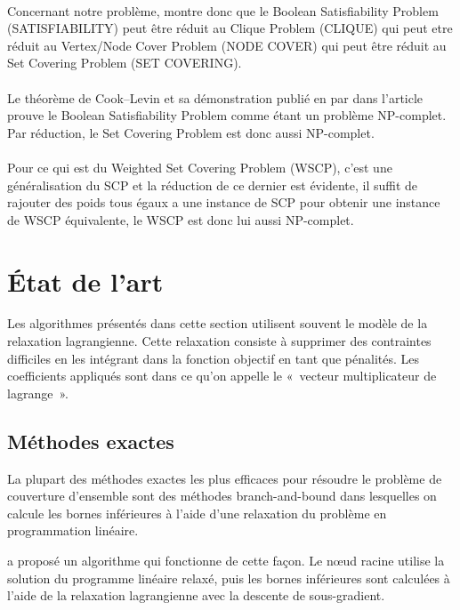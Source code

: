 \documentclass[12pt,letterpaper,twoside]{article}
\begin{document}
		\paragraph*{}
			Concernant notre problème, \citeauthor{Karp1972} montre donc que le Boolean Satisfiability Problem (SATISFIABILITY) peut être réduit au Clique Problem (CLIQUE) qui peut etre réduit au Vertex/Node Cover Problem (NODE COVER) qui peut être réduit au Set Covering Problem (SET COVERING).
		\paragraph*{}
			Le théorème de Cook–Levin et sa démonstration publié en \citeyear{Cook1971} par \citeauthor{Cook1971} dans l'article \cite{Cook1971} prouve le Boolean Satisfiability Problem comme étant un problème NP-complet. Par réduction, le Set Covering Problem est donc aussi NP-complet.
		\paragraph*{}
			Pour ce qui est du Weighted Set Covering Problem (WSCP), c'est une généralisation du SCP et la réduction de ce dernier est évidente, il suffit de rajouter des poids tous égaux a une instance de SCP pour obtenir une instance de WSCP équivalente, le WSCP est donc lui aussi NP-complet.
	\section{État de l'art}
		Les algorithmes présentés dans cette section utilisent souvent le modèle de la relaxation lagrangienne.
		Cette relaxation consiste à supprimer des contraintes difficiles en les intégrant dans la fonction objectif en tant que pénalités.
		Les coefficients appliqués sont dans ce qu'on appelle le « vecteur multiplicateur de lagrange ».~\cite{fisher1985applications}

		\subsection{Méthodes exactes}
			La plupart des méthodes exactes les plus efficaces pour résoudre le problème de couverture d'ensemble sont
			des méthodes branch-and-bound
			dans lesquelles on calcule les bornes inférieures à l'aide d'une relaxation du problème en programmation
			linéaire.~\cite{caprara2000algorithms}

			\citeauthor{Beasley1987} a proposé un algorithme qui fonctionne de cette façon.
			Le nœud racine utilise la solution du programme linéaire relaxé, puis les bornes inférieures
			sont calculées à l'aide de la relaxation lagrangienne avec la descente de sous-gradient.~\cite{Beasley1987}
\end{document}
